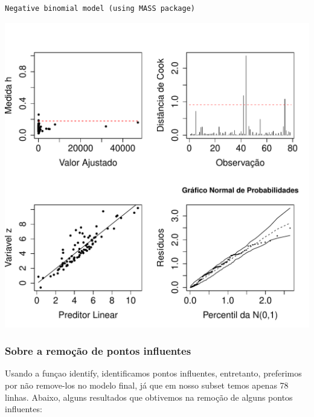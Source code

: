 \documentclass[12pt,a4paper]{article}\usepackage[]{graphicx}\usepackage[]{color}
\makeatletter
\def\maxwidth{ %
  \ifdim\Gin@nat@width>\linewidth
    \linewidth
  \else
    \Gin@nat@width
  \fi
}
\newenvironment{kframe}{%
 \def\at@end@of@kframe{}%
 \ifinner\ifhmode%
  \def\at@end@of@kframe{\end{minipage}}%
  \begin{minipage}{\columnwidth}%
 \fi\fi%
 \def\FrameCommand##1{\hskip\@totalleftmargin \hskip-\fboxsep
 \colorbox{shadecolor}{##1}\hskip-\fboxsep
     \hskip-\linewidth \hskip-\@totalleftmargin \hskip\columnwidth}%
 \MakeFramed {\advance\hsize-\width
   \@totalleftmargin\z@ \linewidth\hsize
   \@setminipage}}%
 {\par\unskip\endMakeFramed%
 \at@end@of@kframe}
\newenvironment{knitrout}{}{} %
\makeatother
\begin{document}
\begin{knitrout}
\color{fgcolor}\begin{kframe}
\begin{verbatim}
Negative binomial model (using MASS package) 
\end{verbatim}
\end{kframe}
\includegraphics[width=\maxwidth]{figure/unnamed-chunk-16-1} 

\end{knitrout}
\subsubsection{\textbf{Sobre a remoção de pontos influentes}}
Usando a funçao identify, identificamos pontos influentes, entretanto, preferimos por não remove-los no modelo final, já que em nosso subset temos apenas 78 linhas.
Abaixo, alguns resultados que obtivemos na remoção de alguns pontos influentes:
\end{document}
